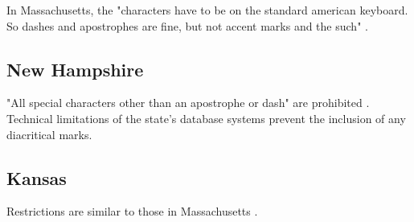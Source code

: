 In Massachusetts, the "characters have to be on the standard american keyboard.
So dashes and apostrophes are fine, but not accent marks and the such"
\parencite{larson11}.

\subsection{New Hampshire}

"All special characters other than an apostrophe or dash" are prohibited
\parencite{larson11}. Technical limitations of the state's database systems
prevent the inclusion of any diacritical marks.

\subsection{Kansas}

Restrictions are similar to those in Massachusetts \parencite{larson11}.
